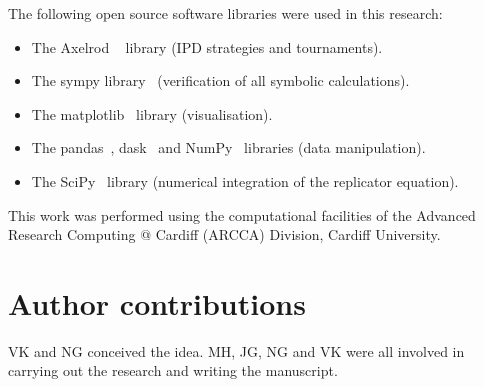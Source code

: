 \documentclass[a4paper]{article}
\begin{document}
The following open source software libraries were used in this research:

\begin{itemize}
    \item The Axelrod ~\cite{Knight2016, Knight2018} library (IPD strategies and
        tournaments).
    \item The sympy library~\cite{Meurer2017} (verification of all symbolic
        calculations).
    \item The matplotlib~\cite{Droettboom2018} library (visualisation).
    \item The pandas~\cite{Structures2010}, dask~\cite{Dask2016} and
        NumPy~\cite{Oliphant2015} libraries (data manipulation).
    \item The SciPy~\cite{Jones2001} library (numerical integration of the
        replicator equation).
\end{itemize}

This work was performed using the computational facilities of the Advanced
Research Computing @ Cardiff (ARCCA) Division, Cardiff University.

\section*{Author contributions}

VK and NG conceived the idea. MH, JG, NG and VK were all involved in carrying
out the research and writing the manuscript.

\printbibliography




\end{document}
